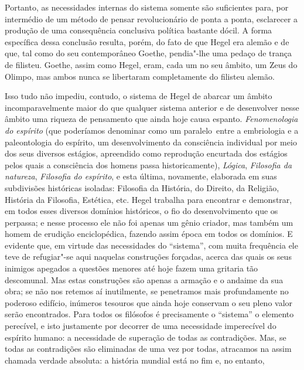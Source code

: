 Portanto, as necessidades internas do sistema somente são suficientes
para, por intermédio de um método de pensar revolucionário de ponta a
ponta, esclarecer a produção de uma consequência conclusiva política %
bastante dócil. A forma específica dessa conclusão 
resulta, porém, do fato de que Hegel era alemão e de que, tal como do seu
contemporâneo Goethe, pendia"-lhe uma pedaço de trança de filisteu. Goethe, assim como Hegel, eram, cada um no seu âmbito, um Zeus do Olimpo, mas ambos nunca se
libertaram completamente do filisteu alemão.

Isso tudo não impediu, contudo, o sistema
de Hegel de abarcar um âmbito incomparavelmente maior do que qualquer sistema
anterior e de desenvolver nesse âmbito uma riqueza de pensamento que %
ainda hoje causa espanto. \emph{Fenomenologia do espírito} (que %
poderíamos denominar como um paralelo\est\ entre a embriologia e a
paleontologia do espírito, um desenvolvimento da consciência individual
por meio dos seus diversos estágios, apreendido como reprodução %
encurtada dos estágios pelos quais a consciência dos homens passa
historicamente), \emph{Lógica}, \emph{Filosofia da natureza},
\emph{Filosofia do espírito}, e esta última, novamente, elaborada em suas
subdivisões históricas isoladas: Filosofia da História, do Direito, da
Religião, História da Filosofia, Estética, etc.
Hegel trabalha
para encontrar e demonstrar, em todos esses diversos domínios
históricos, o fio do desenvolvimento que os perpassa; e nesse processo
ele não foi apenas um gênio criador, mas também um homem de erudição
enciclopédica, fazendo assim época em todos os domínios. E evidente que,
em virtude das necessidades do ``sistema'', com muita frequência ele
teve de refugiar"-se aqui naquelas construções forçadas, acerca das quais %
os seus inimigos apegados a questões menores até hoje fazem uma
gritaria tão descomunal. Mas estas construções são apenas a armação e o
andaime da sua obra; se não nos retemos aí inutilmente, se penetramos
mais profundamente no poderoso edifício, inúmeros tesouros que ainda
hoje conservam o seu pleno valor serão encontrados. Para todos os
filósofos é precisamente o ``sistema'' o elemento perecível, e isto
justamente por decorrer de uma necessidade 
imperecível do espírito humano: a necessidade de superação
de todas as contradições. Mas, se todas as 
contradições são eliminadas de uma vez por todas, atracamos na assim
chamada verdade absoluta: a história mundial está no fim e, no entanto,
